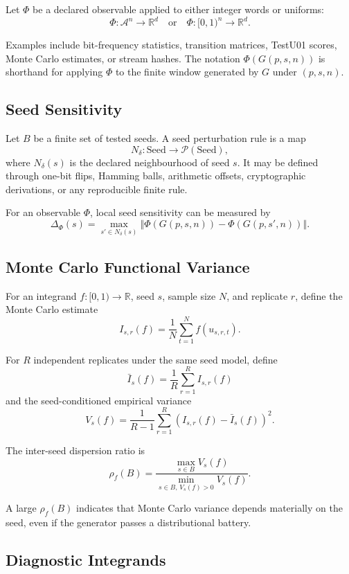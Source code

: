\documentclass[11pt,a4paper]{article}
\begin{document}
Let $\Phi$ be a declared observable applied to either integer words or uniforms:
\[
\Phi : \mathcal{A}^n \to \mathbb{R}^d
\quad\text{or}\quad
\Phi : [0,1)^n \to \mathbb{R}^d.
\]

Examples include bit-frequency statistics, transition matrices, TestU01 scores, Monte Carlo estimates, or stream hashes. The notation $\Phi(G(p,s,n))$ is shorthand for applying $\Phi$ to the finite window generated by $G$ under $(p,s,n)$.

\subsection{Seed Sensitivity}

Let $B$ be a finite set of tested seeds. A seed perturbation rule is a map
\[
N_\delta : \mathrm{Seed} \to \mathcal{P}(\mathrm{Seed}),
\]
where $N_\delta(s)$ is the declared neighbourhood of seed $s$. It may be defined through one-bit flips, Hamming balls, arithmetic offsets, cryptographic derivations, or any reproducible finite rule.

For an observable $\Phi$, local seed sensitivity can be measured by
\[
\Delta_\Phi(s)
  =
  \max_{s'\in N_\delta(s)}
  \left\Vert \Phi(G(p,s,n)) - \Phi(G(p,s',n)) \right\Vert.
\]

\subsection{Monte Carlo Functional Variance}

For an integrand $f:[0,1)\to\mathbb{R}$, seed $s$, sample size $N$, and replicate $r$, define the Monte Carlo estimate
\[
I_{s,r}(f) = \frac{1}{N}\sum_{t=1}^{N} f(u_{s,r,t}).
\]

For $R$ independent replicates under the same seed model, define
\[
\bar I_s(f) = \frac{1}{R}\sum_{r=1}^{R} I_{s,r}(f)
\]
and the seed-conditioned empirical variance
\[
V_s(f)
  =
  \frac{1}{R-1}
  \sum_{r=1}^{R}
  \left(I_{s,r}(f)-\bar I_s(f)\right)^2.
\]

The inter-seed dispersion ratio is
\[
\rho_f(B)
  =
  \frac{\max_{s\in B} V_s(f)}
       {\min_{s\in B,\, V_s(f)>0} V_s(f)}.
\]

A large $\rho_f(B)$ indicates that Monte Carlo variance depends materially on the seed, even if the generator passes a distributional battery.

\subsection{Diagnostic Integrands}
\end{document}
